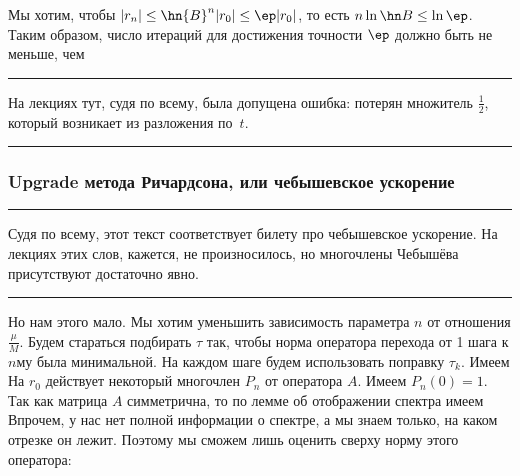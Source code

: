 \documentclass[a4paper]{article}
\newenvironment{petit}{\medskip\hrule\smallskip\footnotesize}{\par\smallskip\hrule\medskip}
\begin{document}
Мы хотим, чтобы $|r_n| \le \hn{B}^n |r_0| \le \ep |r_0|$, то есть $n\ln \hn B \le \ln \ep$.
Таким образом, число итераций для достижения точности $\ep$ должно быть не меньше, чем

\begin{petit}
На лекциях тут, судя по всему, была допущена ошибка: потерян множитель $\frac12$, который
возникает из разложения по~$t$.
\end{petit}

\subsubsection{Upgrade метода Ричардсона, или чебышевское ускорение}

\begin{petit}
Судя по всему, этот текст соответствует билету про чебышевское ускорение. На лекциях этих слов, кажется,
не произносилось, но многочлены Чебышёва присутствуют достаточно явно.
\end{petit}

Но нам этого мало. Мы хотим уменьшить зависимость параметра $n$ от отношения $\frac{\mu}{M}$.
Будем стараться подбирать $\tau$ так, чтобы норма оператора перехода от 1 шага к $n$\д му была минимальной.
На каждом шаге будем использовать поправку $\tau_k$.
Имеем
На $r_0$ действует некоторый многочлен $P_n$ от оператора $A$. Имеем $P_n(0)=1$.
Так как матрица $A$  симметрична, то по лемме об отображении спектра имеем
Впрочем, у нас нет полной информации о спектре, а мы знаем только, на каком отрезке он лежит.
Поэтому мы сможем лишь оценить сверху норму этого оператора:
\end{document}
